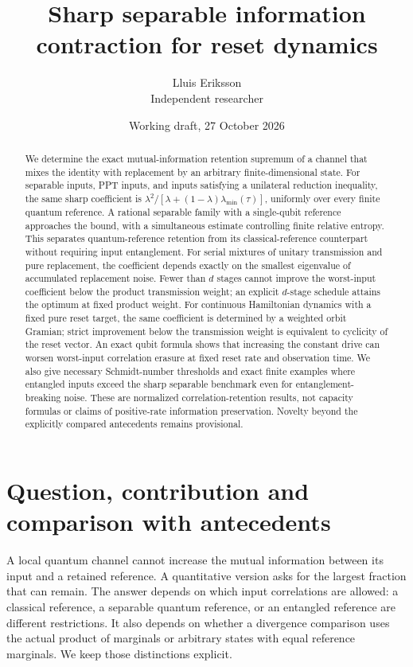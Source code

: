 \documentclass[11pt]{article}
\title{Sharp separable information contraction for reset dynamics}
\author{Lluis Eriksson\\\small Independent researcher}
\date{Working draft, 27 October 2026}
\begin{document}
\maketitle
\begin{abstract}
We determine the exact mutual-information retention supremum of a channel that mixes the identity with replacement by an arbitrary finite-dimensional state. For separable inputs, PPT inputs, and inputs satisfying a unilateral reduction inequality, the same sharp coefficient is $\lambda^2/[\lambda+(1-\lambda)\lambda_{\min}(\tau)]$, uniformly over every finite quantum reference. A rational separable family with a single-qubit reference approaches the bound, with a simultaneous estimate controlling finite relative entropy. This separates quantum-reference retention from its classical-reference counterpart without requiring input entanglement. For serial mixtures of unitary transmission and pure replacement, the coefficient depends exactly on the smallest eigenvalue of accumulated replacement noise. Fewer than $d$ stages cannot improve the worst-input coefficient below the product transmission weight; an explicit $d$-stage schedule attains the optimum at fixed product weight. For continuous Hamiltonian dynamics with a fixed pure reset target, the same coefficient is determined by a weighted orbit Gramian; strict improvement below the transmission weight is equivalent to cyclicity of the reset vector. An exact qubit formula shows that increasing the constant drive can worsen worst-input correlation erasure at fixed reset rate and observation time. We also give necessary Schmidt-number thresholds and exact finite examples where entangled inputs exceed the sharp separable benchmark even for entanglement-breaking noise. These are normalized correlation-retention results, not capacity formulas or claims of positive-rate information preservation. Novelty beyond the explicitly compared antecedents remains provisional.
\end{abstract}

\section{Question, contribution and comparison with antecedents}
A local quantum channel cannot increase the mutual information between its input and a retained reference. A quantitative version asks for the largest fraction that can remain. The answer depends on which input correlations are allowed: a classical reference, a separable quantum reference, or an entangled reference are different restrictions. It also depends on whether a divergence comparison uses the actual product of marginals or arbitrary states with equal reference marginals. We keep those distinctions explicit.
\end{document}
